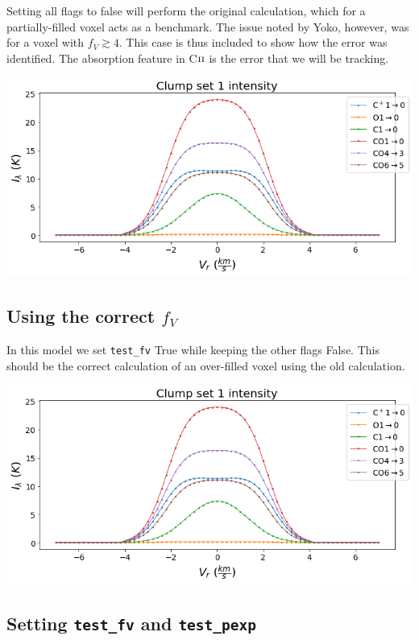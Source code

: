 \documentclass[a4paper]{article}
\newcommand{\mathsc}[1]{{\normalfont\textsc{#1}}}
\begin{document}
    Setting all flags to false will perform the original calculation, which for a partially-filled voxel acts as a benchmark.
    The issue noted by Yoko, however, was for a voxel with \(f_V \gtrsim 4\).
    This case is thus included to show how the error was identified.
    The absorption feature in C\(\mathsc{ii}\) is the error that we will be tracking.

    \includegraphics*[width=\linewidth]{voxel_error_original.png}

    \pagebreak

    \subsection{Using the correct \(f_V\)}

    In this model we set \texttt{test\_fv} True while keeping the other flags False.
    This should be the correct calculation of an over-filled voxel using the old calculation.

    \includegraphics*[width=\linewidth]{voxel_error_fv.png}

    \subsection{Setting \texttt{test\_fv} and \texttt{test\_pexp}}
\end{document}
